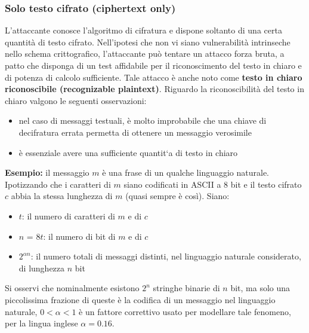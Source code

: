 \subsubsection{Solo testo cifrato (ciphertext only)}
L’attaccante conosce l’algoritmo di cifratura e dispone soltanto di una certa quantità di testo cifrato. Nell’ipotesi che non vi siano vulnerabilità intrinseche nello schema crittografico, l’attaccante può tentare un attacco forza bruta, a patto che disponga di un test affidabile per il riconoscimento del testo in chiaro e di potenza di calcolo sufficiente. Tale attacco è anche noto come \textbf{testo in chiaro riconoscibile (recognizable plaintext)}. Riguardo la riconoscibilità del testo in chiaro valgono le seguenti osservazioni:
\begin{itemize} 
  \item nel caso di messaggi testuali, è molto improbabile che una chiave di decifratura errata permetta di ottenere un messaggio verosimile
  \item è essenziale avere una sufficiente quantit`a di testo in chiaro
\end{itemize}
\textbf{Esempio:} il messaggio $m$ è una frase di un qualche linguaggio naturale. Ipotizzando che i caratteri di $m$ siano codificati in ASCII a 8 bit e il testo cifrato $c$ abbia la stessa lunghezza di $m$ (quasi sempre è così). Siano:
\begin{itemize} 
  \item $t$: il numero di caratteri di $m$ e di $c$
  \item $n$ = $8t$: il numero di bit di $m$ e di $c$
  \item $2^{\alpha n}$: il numero totali di messaggi distinti, nel linguaggio naturale considerato, di lunghezza $n$ bit
\end{itemize}
Si osservi che nominalmente esistono $2^n$ stringhe binarie di $n$ bit, ma solo una piccolissima frazione di queste è la codifica di un messaggio nel linguaggio naturale, $0 < \alpha < 1$ è un fattore correttivo usato per modellare tale fenomeno, per la lingua inglese $\alpha = 0.16$.
